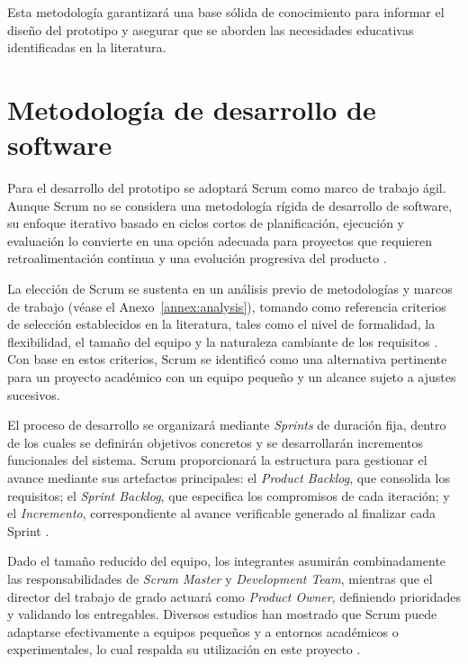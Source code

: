 Esta metodología garantizará una base sólida de conocimiento para informar el diseño del prototipo y asegurar que se aborden las necesidades educativas identificadas en la literatura.

\section{Metodología de desarrollo de software}

Para el desarrollo del prototipo se adoptará Scrum como marco de trabajo ágil. Aunque Scrum no se considera una metodología rígida de desarrollo de software, su enfoque iterativo basado en ciclos cortos de planificación, ejecución y evaluación lo convierte en una opción adecuada para proyectos que requieren retroalimentación continua y una evolución progresiva del producto \cite{ScrumGuide2020, AtlassianScrum2025}.

La elección de Scrum se sustenta en un análisis previo de metodologías y marcos de trabajo (véase el Anexo~\ref{annex:analysis}), tomando como referencia criterios de selección establecidos en la literatura, tales como el nivel de formalidad, la flexibilidad, el tamaño del equipo y la naturaleza cambiante de los requisitos \cite{quinonez2019analisis}. Con base en estos criterios, Scrum se identificó como una alternativa pertinente para un proyecto académico con un equipo pequeño y un alcance sujeto a ajustes sucesivos.

El proceso de desarrollo se organizará mediante \textit{Sprints} de duración fija, dentro de los cuales se definirán objetivos concretos y se desarrollarán incrementos funcionales del sistema. Scrum proporcionará la estructura para gestionar el avance mediante sus artefactos principales: el \textit{Product Backlog}, que consolida los requisitos; el \textit{Sprint Backlog}, que especifica los compromisos de cada iteración; y el \textit{Incremento}, correspondiente al avance verificable generado al finalizar cada Sprint \cite{ScrumGuide2020}.

Dado el tamaño reducido del equipo, los integrantes asumirán combinadamente las responsabilidades de \textit{Scrum Master} y \textit{Development Team}, mientras que el director del trabajo de grado actuará como \textit{Product Owner}, definiendo prioridades y validando los entregables. Diversos estudios han mostrado que Scrum puede adaptarse efectivamente a equipos pequeños y a entornos académicos o experimentales, lo cual respalda su utilización en este proyecto \cite{Masood2021RealWorldScrum, DiazVargas2018}.

